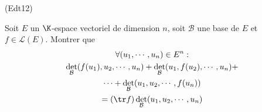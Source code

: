 \begin{tiny}(Edt12)\end{tiny} Soit $E$ un $\K$-espace vectoriel de dimension $n$, soit $\mathcal B$ une base de $E$ et $f\in \mathcal L(E)$. Montrer que
\begin{multline*}
\forall(u_1,\cdots,u_n)\in E^n : \\
 \det_\mathcal B(f(u_1),u_2,\cdots,u_n)
+ \det_\mathcal B(u_1,f(u_2),\cdots,u_n) + \\ \cdots + 
\det_\mathcal B(u_1,u_2,\cdots,f(u_n))\\
= (\tr f) \det_\mathcal B (u_1,u_2,\cdots,u_n)
\end{multline*}
